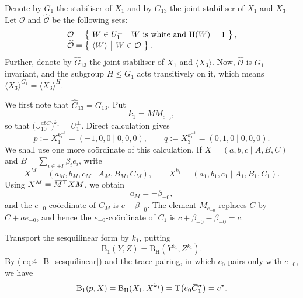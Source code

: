 \documentclass{amsart}
\def\ovC{\mathord{\mbox{\hspace*{0pt}}\,\overline{\!C\!\!\;}\!\:}\mbox{\hspace*{0pt}}}
\def\ovM{\mathord{\mbox{\hspace*{0pt}}\,\overline{\!M\!\!\;}\!\:}\mbox{\hspace*{0pt}}}
\newcommand{\Tr}{\operatorname{T}}
\newcommand{\J}{\mathbb{J}}
\renewcommand{\hat}{\widehat}
\newcommand{\B}{\mathrm{B}}
\renewcommand{\H}{\mathrm{H}}
\newcommand{\s}{\sigma}
\newcommand{\T}{\top}
\theoremstyle{plain}
\numberwithin{theorem}{section}
\theoremstyle{definition}
\begin{document}
Denote by $G_1$ the stabiliser of $X_1$ and by $G_{13}$ the
joint stabiliser of $X_1$ and $X_3$. Let $\mathcal{O}$ and
$\hat{\mathcal{O}}$ be
the following sets:
\begin{equation}
	\begin{array}{r@{\;}c@{\;}l}
	\mathcal{O} & = & 
	\left\{\ W \in U_1^{\perp}\ \big|\ \mbox{$W$ is white and
		$\H(W)=1$ } \right\}, \\
		
	\hat{\mathcal{O}} & = & \left\{ 
		\ \langle W \rangle\ \big|\ W \in \mathcal{O}\ 
	\right\}.
	\end{array}
\end{equation}
Further, denote by $\hat{G}_{13}$ the joint stabiliser
of $X_1$ and $\langle X_3 \rangle$. Now, $\hat{\mathcal{O}}$
is $G_1$-invariant, and the subgroup $H \leqslant G_1$
acts transitively on it, which means 
$\langle X_3 \rangle^{G_1} = \langle X_3 \rangle^H$.

We first note that $\hat G_{13}=G_{13}$.  Put
\begin{equation*}
	 k_1=M M_{e_{-0}},
\end{equation*}
so that $\bigl(\J_{10}^{abC}\bigr)^{k_1}=U_1^{\perp}$.  Direct calculation gives
\begin{equation*}
	 p:=X_1^{k_1^{-1}}=(-1,0,0\mid0,0,0),\qquad
	 q:=X_3^{k_1^{-1}}=(0,1,0\mid0,0,0).
\end{equation*}
We shall use one more co\"{o}rdinate of this calculation.  If
$X=(a,b,c\mid A,B,C)$ and $B=\sum_{i\in\pm I}\beta_i e_i$, write
\begin{equation*}
	 X^M=(a_M,b_M,c_M\mid A_M,B_M,C_M),\qquad
	 X^{k_1}=(a_1,b_1,c_1\mid A_1,B_1,C_1).
\end{equation*}
Using $X^M=\ovM^{\T} X M$, we obtain
\begin{equation*}
	 a_M=-\beta_{-0},
\end{equation*}
and the $e_{-0}$-co\"{o}rdinate of $C_M$ is
$c+\beta_{-0}$.
The element $M_{e_{-0}}$ replaces $C$ by $C+a e_{-0}$, and hence
the $e_{-0}$-co\"{o}rdinate of $C_1$ is
$c+\beta_{-0}-\beta_{-0}=c$.

Transport the sesquilinear form by $k_1$, putting
\begin{equation*}
	 \B_1(Y,Z)=\B_{\H}(Y^{k_1},Z^{k_1}).
\end{equation*}
By (\ref{eq:4_B_sesquilinear}) and the trace pairing, in which
$e_0$ pairs only with $e_{-0}$, we have
\begin{equation}
	 \label{eq:7_type1_k1_pairing}
	 \B_1(p,X)=\B_{\H}(X_1,X^{k_1})
	 =\Tr\!\left(e_0\ovC_1^{\s}\right)=c^{\s}.
\end{equation}
\end{document}
